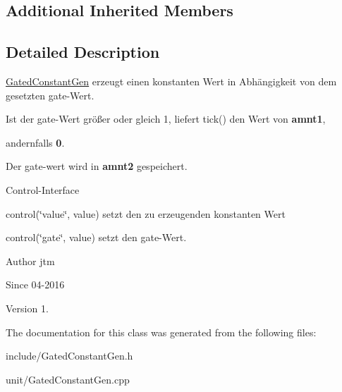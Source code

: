 \subsection*{Additional Inherited Members}


\subsection{Detailed Description}
\hyperlink{classunit_1_1GatedConstantGen}{Gated\+Constant\+Gen} erzeugt einen konstanten Wert in Abhängigkeit von dem gesetzten gate-\/\+Wert.


\begin{DoxyItemize}
\item Ist der gate-\/\+Wert größer oder gleich 1, liefert tick() den Wert von {\bfseries amnt1},
\item andernfalls {\bfseries 0}.
\item Der gate-\/wert wird in {\bfseries amnt2} gespeichert.
\end{DoxyItemize}

Control-\/\+Interface


\begin{DoxyItemize}
\item control(\char`\"{}value\char`\"{}, value) setzt den zu erzeugenden konstanten Wert
\item control(\char`\"{}gate\char`\"{}, value) setzt den gate-\/\+Wert.
\end{DoxyItemize}

\begin{DoxyAuthor}{Author}
jtm 
\end{DoxyAuthor}
\begin{DoxySince}{Since}
04-\/2016 
\end{DoxySince}
\begin{DoxyVersion}{Version}
1. 
\end{DoxyVersion}


The documentation for this class was generated from the following files\+:\begin{DoxyCompactItemize}
\item 
include/Gated\+Constant\+Gen.\+h\item 
unit/Gated\+Constant\+Gen.\+cpp\end{DoxyCompactItemize}
